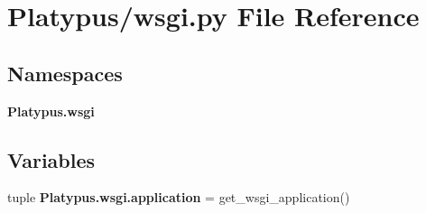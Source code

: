 \section{Platypus/wsgi.py File Reference}
\label{wsgi_8py}
\subsection*{Namespaces}
\begin{DoxyCompactItemize}
\item 
 {\bf Platypus.\+wsgi}
\end{DoxyCompactItemize}
\subsection*{Variables}
\begin{DoxyCompactItemize}
\item 
tuple {\bf Platypus.\+wsgi.\+application} = get\+\_\+wsgi\+\_\+application()
\end{DoxyCompactItemize}
